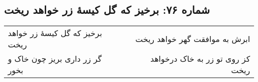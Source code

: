 \begin{center}
\section*{شماره ۷۶: برخیز که گل کیسۀ زر خواهد ریخت}
\label{sec:076}
\begin{longtable}{l p{0.5cm} r}
برخیز که گل کیسهٔ زر خواهد ریخت
&&
ابرش به موافقت گهر خواهد ریخت
\\
گر زر داری بریز چون خاک و بخور
&&
کز روی تو زر به خاک درخواهد ریخت
\\
\end{longtable}
\end{center}
